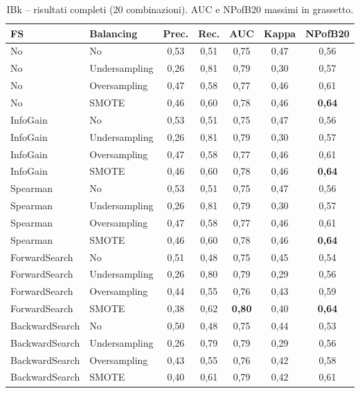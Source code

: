 \begin{table}[h!]
\centering
\small
\begin{tabular}{@{}llccccc@{}}
\toprule
\textbf{FS} & \textbf{Balancing} & \textbf{Prec.} & \textbf{Rec.} &
\textbf{AUC} & \textbf{Kappa} & \textbf{NPofB20} \\
\midrule
No             & No            & 0,53 & 0,51 & 0,75 & 0,47 & 0,56 \\
No             & Undersampling & 0,26 & 0,81 & 0,79 & 0,30 & 0,57 \\
No             & Oversampling  & 0,47 & 0,58 & 0,77 & 0,46 & 0,61 \\
No             & SMOTE         & 0,46 & 0,60 & 0,78 & 0,46 & \textbf{0,64} \\
InfoGain       & No            & 0,53 & 0,51 & 0,75 & 0,47 & 0,56 \\
InfoGain       & Undersampling & 0,26 & 0,81 & 0,79 & 0,30 & 0,57 \\
InfoGain       & Oversampling  & 0,47 & 0,58 & 0,77 & 0,46 & 0,61 \\
InfoGain       & SMOTE         & 0,46 & 0,60 & 0,78 & 0,46 & \textbf{0,64} \\
Spearman       & No            & 0,53 & 0,51 & 0,75 & 0,47 & 0,56 \\
Spearman       & Undersampling & 0,26 & 0,81 & 0,79 & 0,30 & 0,57 \\
Spearman       & Oversampling  & 0,47 & 0,58 & 0,77 & 0,46 & 0,61 \\
Spearman       & SMOTE         & 0,46 & 0,60 & 0,78 & 0,46 & \textbf{0,64} \\
ForwardSearch  & No            & 0,51 & 0,48 & 0,75 & 0,45 & 0,54 \\
ForwardSearch  & Undersampling & 0,26 & 0,80 & 0,79 & 0,29 & 0,56 \\
ForwardSearch  & Oversampling  & 0,44 & 0,55 & 0,76 & 0,43 & 0,59 \\
ForwardSearch  & SMOTE         & 0,38 & 0,62 & \textbf{0,80} & 0,40 & \textbf{0,64} \\
BackwardSearch & No            & 0,50 & 0,48 & 0,75 & 0,44 & 0,53 \\
BackwardSearch & Undersampling & 0,26 & 0,79 & 0,79 & 0,29 & 0,56 \\
BackwardSearch & Oversampling  & 0,43 & 0,55 & 0,76 & 0,42 & 0,58 \\
BackwardSearch & SMOTE         & 0,40 & 0,61 & 0,79 & 0,42 & 0,61 \\
\bottomrule
\end{tabular}
\caption{IBk -- risultati completi (20 combinazioni). AUC e NPofB20 massimi in grassetto.}
\label{tab:ibk-full}
\end{table}

